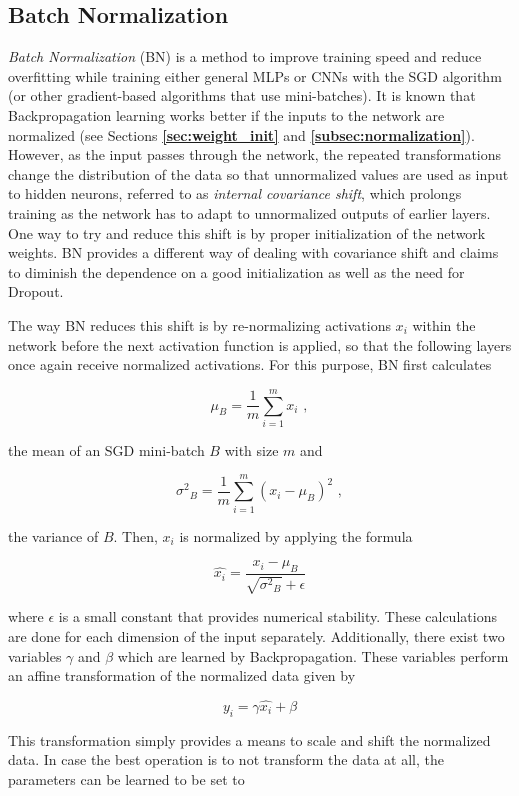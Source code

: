 	\subsection {Batch Normalization}
\label{subsec:batchnorm}
\textit{Batch Normalization} (BN) \cite{batchnorm, batchnorm_pres} is a method to improve training speed and reduce overfitting while training either general MLPs or CNNs with the SGD algorithm (or other gradient-based algorithms that use mini-batches). It is known that Backpropagation learning works better if the inputs to the network are normalized (see Sections \textbf{\ref{sec:weight_init}} and \textbf{\ref{subsec:normalization}}). However, as the input passes through the network, the repeated transformations change the distribution of the data so that unnormalized values are used as input to hidden neurons, referred to as \textit{internal covariance shift}, which prolongs training as the network has to adapt to unnormalized outputs of earlier layers. One way to try and reduce this shift is by proper initialization of the network weights. BN provides a different way of dealing with covariance shift and claims to diminish the dependence on a good initialization as well as the need for Dropout.

The way BN reduces this shift is by re-normalizing activations $x_i$ within the network before the next activation function is applied, so that the following layers once again receive normalized activations. For this purpose, BN first calculates

\[ \mu_B = \frac{1}{m} \sum \limits_{i=1}^{m} x_i\,\, , \]

\noindent the mean of an SGD mini-batch $B$ with size $m$ and

\[ {\sigma^2}_B = \frac{1}{m} \sum \limits_{i=1}^{m} \left ( x_i - \mu_B \right )^2 \,\, , \]

\noindent the variance of $B$. Then, $x_i$ is normalized by applying the formula

\[  \hat{x_i} = \frac{x_i - \mu_B}{\sqrt{{\sigma^2}_B} + \epsilon} \]

\noindent where $\epsilon$ is a small constant that provides numerical stability. These calculations are done for each dimension of the input separately. Additionally, there exist two variables $\gamma$ and $\beta$ which are learned by Backpropagation. These variables perform an affine transformation of the normalized data given by

\[ y_i = \gamma \hat{x_i} + \beta \]

\noindent This transformation simply provides a means to scale and shift the normalized data. In case the best operation is to not transform the data at all, the parameters can be learned to be set to 

